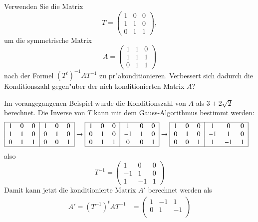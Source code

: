 Verwenden Sie die Matrix 
\[
T=\begin{pmatrix}
1&0&0\\
1&1&0\\
0&1&1
\end{pmatrix},
\]
um die symmetrische Matrix
\[
A=\begin{pmatrix}
1&1&0\\
1&1&1\\
0&1&1
\end{pmatrix}
\]
nach der Formel $(T^t)^{-1}AT^{-1}$ zu
pr"akonditionieren.
Verbessert sich dadurch die Konditionszahl gegen"uber der nich konditionierten
Matrix $A$?

\begin{loesung}
Im vorangegangenen Beispiel wurde die Konditionszahl von $A$ als $3+2\sqrt{2}$
berechnet.
Die Inverse von $T$ kann mit dem Gauss-Algorithmus bestimmt werden:
\begin{align*}
\begin{tabular}{|>{$}c<{$}>{$}c<{$}>{$}c<{$}|>{$}c<{$}>{$}c<{$}>{$}c<{$}|}
\hline
1&0&0&1&0&0\\
1&1&0&0&1&0\\
0&1&1&0&0&1\\
\hline
\end{tabular}
&
\rightarrow
\begin{tabular}{|>{$}c<{$}>{$}c<{$}>{$}c<{$}|>{$}c<{$}>{$}c<{$}>{$}c<{$}|}
\hline
1&0&0& 1&0&0\\
0&1&0&-1&1&0\\
0&1&1& 0&0&1\\
\hline
\end{tabular}
\rightarrow
\begin{tabular}{|>{$}c<{$}>{$}c<{$}>{$}c<{$}|>{$}c<{$}>{$}c<{$}>{$}c<{$}|}
\hline
1&0&0& 1& 0&0\\
0&1&0&-1& 1&0\\
0&0&1& 1&-1&1\\
\hline
\end{tabular}
\end{align*}
also
\[
T^{-1}=
\begin{pmatrix}
 1& 0&0\\
-1& 1&0\\
 1&-1&1
\end{pmatrix}
\]
Damit kann jetzt die konditionierte Matrix $A'$ berechnet werden als
\begin{align*}
A'=
(T^{-1})^tAT^{-1}
&=
\begin{pmatrix}
 1&-1& 1\\
 0& 1&-1\\

\end{pmatrix}
\end{align*}
\end{loesung}
